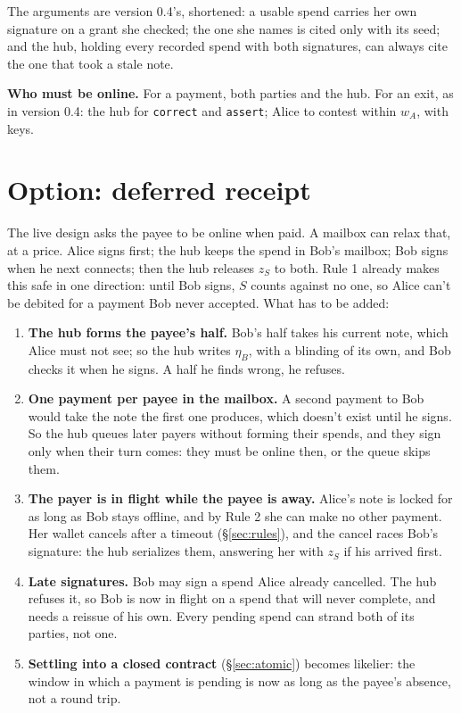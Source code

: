 \documentclass[11pt]{article}
\theoremstyle{plain}
\theoremstyle{definition}
\newcommand{\tx}[1]{\texttt{#1}}
\begin{document}
The arguments are version 0.4's, shortened: a usable spend carries her
own signature on a grant she checked; the one she names is cited only
with its seed; and the hub, holding every recorded spend with both
signatures, can always cite the one that took a stale note.

\textbf{Who must be online.} For a payment, both parties and the hub.
For an exit, as in version 0.4: the hub for \tx{correct} and
\tx{assert}; Alice to contest within $w_A$, with keys.

\section{Option: deferred receipt}\label{sec:deferred}

The live design asks the payee to be online when paid. A mailbox can
relax that, at a price. Alice signs first; the hub keeps the spend in
Bob's mailbox; Bob signs when he next connects; then the hub releases
$z_S$ to both. Rule 1 already makes this safe in one direction: until
Bob signs, $S$ counts against no one, so Alice can't be debited for a
payment Bob never accepted. What has to be added:

\begin{enumerate}[nosep]
\item \textbf{The hub forms the payee's half.} Bob's half takes his
  current note, which Alice must not see; so the hub writes $\eta_B$,
  with a blinding of its own, and Bob checks it when he signs. A half
  he finds wrong, he refuses.
\item \textbf{One payment per payee in the mailbox.} A second payment to
  Bob would take the note the first one produces, which doesn't exist
  until he signs. So the hub queues later payers without forming their
  spends, and they sign only when their turn comes: they must be online
  then, or the queue skips them.
\item \textbf{The payer is in flight while the payee is away.} Alice's
  note is locked for as long as Bob stays offline, and by Rule 2 she
  can make no other payment. Her wallet cancels after a timeout
  (\S\ref{sec:rules}), and the cancel races Bob's signature: the hub
  serializes them, answering her with $z_S$ if his arrived first.
\item \textbf{Late signatures.} Bob may sign a spend Alice already
  cancelled. The hub refuses it, so Bob is now in flight on a spend that
  will never complete, and needs a reissue of his own. Every pending
  spend can strand both of its parties, not one.
\item \textbf{Settling into a closed contract} (\S\ref{sec:atomic})
  becomes likelier: the window in which a payment is pending is now as
  long as the payee's absence, not a round trip.
\end{enumerate}
\end{document}
